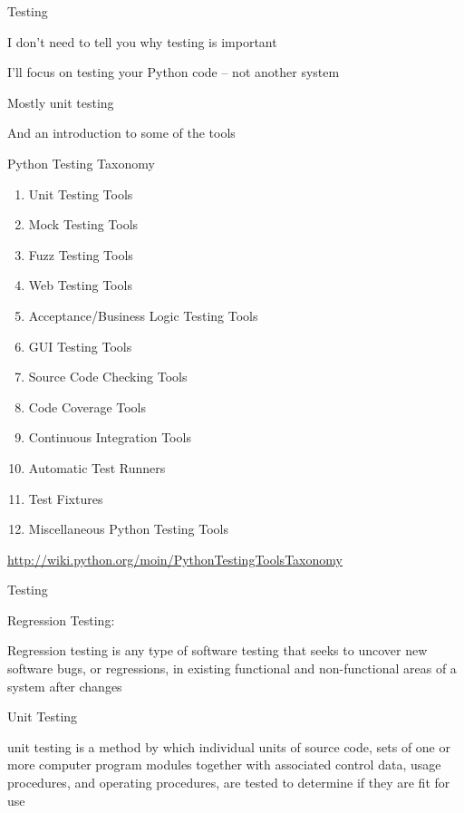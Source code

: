 \documentclass{beamer}
\begin{document}
\begin{frame}[fragile]{Testing}

\vfill
{\Large I don't need to tell you why testing is important}

\vfill
{\Large I'll focus on testing your Python code -- not another system}

\vfill
{\Large Mostly unit testing}

\vfill
{\Large And an introduction to some of the tools}

\vfill

\end{frame} 

\begin{frame}[fragile]{Python Testing Taxonomy}

\begin{enumerate}
  \item   Unit Testing Tools
  \item    Mock Testing Tools
  \item    Fuzz Testing Tools
  \item    Web Testing Tools
  \item    Acceptance/Business Logic Testing Tools
  \item    GUI Testing Tools
  \item    Source Code Checking Tools
  \item    Code Coverage Tools
  \item    Continuous Integration Tools
  \item    Automatic Test Runners
  \item    Test Fixtures
  \item    Miscellaneous Python Testing Tools
\end{enumerate}

\vfill
\url{http://wiki.python.org/moin/PythonTestingToolsTaxonomy}

\end{frame} 


\begin{frame}[fragile]{Testing}

\vfill
{\LARGE Regression Testing:}

\vfill
{\Large Regression testing is any type of software testing that seeks to
uncover new software bugs, or regressions, in existing functional and
non-functional areas of a system after changes}

\vfill
{\Large Unit Testing}

\vfill
{\Large unit testing is a method by which individual units of source code,
sets of one or more computer program modules together with associated control
data, usage procedures, and operating procedures, are tested to determine if
they are fit for use}

\vfill

\end{frame} 
\end{document}
